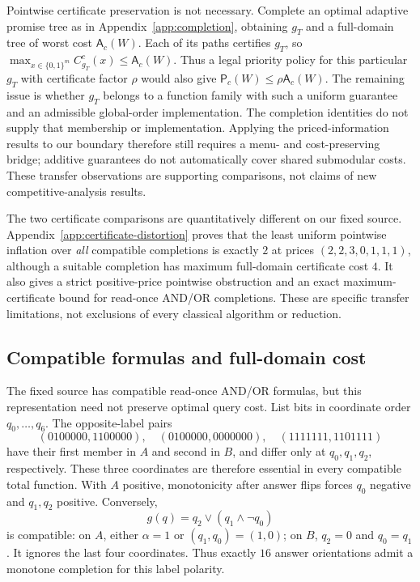\documentclass[pdflatex,sn-mathphys-num]{sn-jnl}
\newcommand{\A}{\mathsf{A}}
\newcommand{\Pcost}{\mathsf{P}}
\theoremstyle{thmstyleone}
\theoremstyle{thmstylethree}
\theoremstyle{thmstyletwo}
\begin{document}
Pointwise certificate preservation is not necessary. Complete an optimal adaptive promise tree as in Appendix~\ref{app:completion}, obtaining $g_T$ and a full-domain tree of worst cost $\A_c(W)$. Each of its paths certifies $g_T$, so $\max_{x\in\{0,1\}^m}C_{g_T}^c(x)\leq\A_c(W)$. Thus a legal priority policy for this particular $g_T$ with certificate factor $\rho$ would also give $\Pcost_c(W)\leq\rho\A_c(W)$. The remaining issue is whether $g_T$ belongs to a function family with such a uniform guarantee and an admissible global-order implementation. The completion identities do not supply that membership or implementation. Applying the priced-information results to our boundary therefore still requires a menu- and cost-preserving bridge; additive guarantees do not automatically cover shared submodular costs. These transfer observations are supporting comparisons, not claims of new competitive-analysis results.

The two certificate comparisons are quantitatively different on our fixed source. Appendix~\ref{app:certificate-distortion} proves that the least uniform pointwise inflation over \emph{all} compatible completions is exactly $2$ at prices $(2,2,3,0,1,1,1)$, although a suitable completion has maximum full-domain certificate cost $4$. It also gives a strict positive-price pointwise obstruction and an exact maximum-certificate bound for read-once AND/OR completions. These are specific transfer limitations, not exclusions of every classical algorithm or reduction.


\subsection{Compatible formulas and full-domain cost}\label{sec:ro-completion}
The fixed source has compatible read-once AND/OR formulas, but this representation need not preserve optimal query cost. List bits in coordinate order $q_0,\ldots,q_6$. The opposite-label pairs
\[
 (0100000,1100000),\quad(0100000,0000000),\quad
 (1111111,1101111)
\]
have their first member in $A$ and second in $B$, and differ only at $q_0,q_1,q_2$, respectively. These three coordinates are therefore essential in every compatible total function. With $A$ positive, monotonicity after answer flips forces $q_0$ negative and $q_1,q_2$ positive. Conversely,
\[
 g(q)=q_2\lor(q_1\land\neg q_0)
\]
is compatible: on $A$, either $\alpha=1$ or $(q_1,q_0)=(1,0)$; on $B$, $q_2=0$ and $q_0=q_1$. It ignores the last four coordinates. Thus exactly $16$ answer orientations admit a monotone completion for this label polarity.
\end{document}
